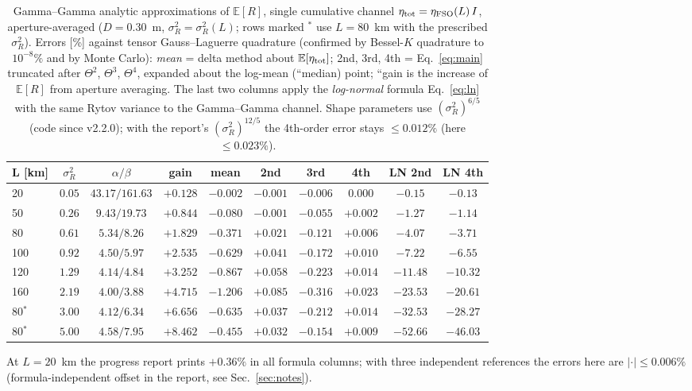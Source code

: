 \begin{table}[htbp]
\centering\scriptsize
\caption{Gamma--Gamma analytic approximations of $\mathbb E[R]$, single cumulative channel $\eta_{\rm tot}=\eta_{\rm FSO}(L)\,I$, aperture-averaged ($D=0.30$~m, $\sigma_R^2=\sigma_R^2(L)$; rows marked $^{*}$ use $L=80$~km with the prescribed $\sigma_R^2$). Errors [\%] against tensor Gauss--Laguerre quadrature (confirmed by Bessel-$K$ quadrature to $10^{-8}\%$ and by Monte Carlo): \emph{mean} = delta method about $\mathbb E[\eta_{\rm tot}]$; 2nd, 3rd, 4th = Eq.~\eqref{eq:main} truncated after $\Theta^2$, $\Theta^3$, $\Theta^4$, expanded about the log-mean (``median) point; ``gain is the increase of $\mathbb E[R]$ from aperture averaging. The last two columns apply the \emph{log-normal} formula Eq.~\eqref{eq:ln} with the same Rytov variance to the Gamma--Gamma channel. Shape parameters use $(\sigma_R^2)^{6/5}$ (code since v2.2.0); with the report's $(\sigma_R^2)^{12/5}$ the 4th-order error stays $\le0.012\%$ (here $\le0.023\%$).}
\label{tab:gg-single}
\begin{tabular}{lccccccccc}
\toprule
L [km] & $\sigma_R^2$ & $\alpha/\beta$ & gain & mean & 2nd & 3rd & 4th & LN 2nd & LN 4th\\
\midrule
20 & $0.05$ & $43.17/161.63$ & $+0.128$ & $-0.002$ & $-0.001$ & $-0.006$ & $0.000$ & $-0.15$ & $-0.13$ \\
50 & $0.26$ & $9.43/19.73$ & $+0.844$ & $-0.080$ & $-0.001$ & $-0.055$ & $+0.002$ & $-1.27$ & $-1.14$ \\
80 & $0.61$ & $5.34/8.26$ & $+1.829$ & $-0.371$ & $+0.021$ & $-0.121$ & $+0.006$ & $-4.07$ & $-3.71$ \\
100 & $0.92$ & $4.50/5.97$ & $+2.535$ & $-0.629$ & $+0.041$ & $-0.172$ & $+0.010$ & $-7.22$ & $-6.55$ \\
120 & $1.29$ & $4.14/4.84$ & $+3.252$ & $-0.867$ & $+0.058$ & $-0.223$ & $+0.014$ & $-11.48$ & $-10.32$ \\
160 & $2.19$ & $4.00/3.88$ & $+4.715$ & $-1.206$ & $+0.085$ & $-0.316$ & $+0.023$ & $-23.53$ & $-20.61$ \\
80$^{*}$ & $3.00$ & $4.12/6.34$ & $+6.656$ & $-0.635$ & $+0.037$ & $-0.212$ & $+0.014$ & $-32.53$ & $-28.27$ \\
80$^{*}$ & $5.00$ & $4.58/7.95$ & $+8.462$ & $-0.455$ & $+0.032$ & $-0.154$ & $+0.009$ & $-52.66$ & $-46.03$ \\

\bottomrule
\end{tabular}
\par\smallskip
\begin{minipage}{0.95\linewidth}\footnotesize At $L=20$~km the progress report prints $+0.36\%$ in all formula columns; with three independent references the errors here are $|\cdot|\le0.006\%$ (formula-independent offset in the report, see Sec.~\ref{sec:notes}).\end{minipage}
\end{table}

